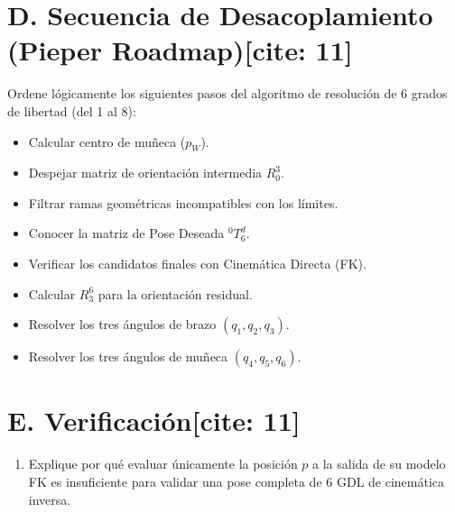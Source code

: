 \documentclass[11pt, a4paper]{article}
\begin{document}
\vspace{2cm}

\section*{D. Secuencia de Desacoplamiento (Pieper Roadmap)[cite: 11]}
Ordene lógicamente los siguientes pasos del algoritmo de resolución de 6 grados de libertad (del 1 al 8):
\begin{itemize}
    \item[\rule{1cm}{0.15mm}] Calcular centro de muñeca ($p_W$).
    \item[\rule{1cm}{0.15mm}] Despejar matriz de orientación intermedia $R_0^3$.
    \item[\rule{1cm}{0.15mm}] Filtrar ramas geométricas incompatibles con los límites.
    \item[\rule{1cm}{0.15mm}] Conocer la matriz de Pose Deseada ${}^0T_6^d$.
    \item[\rule{1cm}{0.15mm}] Verificar los candidatos finales con Cinemática Directa (FK).
    \item[\rule{1cm}{0.15mm}] Calcular $R_3^6$ para la orientación residual.
    \item[\rule{1cm}{0.15mm}] Resolver los tres ángulos de brazo $(q_1, q_2, q_3)$.
    \item[\rule{1cm}{0.15mm}] Resolver los tres ángulos de muñeca $(q_4, q_5, q_6)$.
\end{itemize}

\section*{E. Verificación[cite: 11]}
\begin{enumerate}
    \item Explique por qué evaluar únicamente la posición $p$ a la salida de su modelo FK es insuficiente para validar una pose completa de 6 GDL de cinemática inversa.
\end{enumerate}
\end{document}
